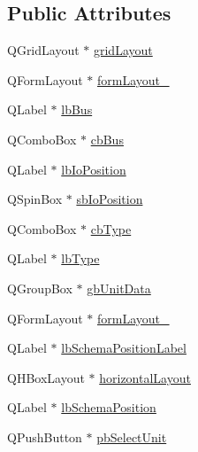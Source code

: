 \subsection*{Public Attributes}
\begin{DoxyCompactItemize}
\item 
Q\-Grid\-Layout $\ast$ \hyperlink{class_ui__mdt_tt_test_node_unit_dialog_a419b2d2d74bbf4b4aeaf0bb4e5357e22}{grid\-Layout}
\item 
Q\-Form\-Layout $\ast$ \hyperlink{class_ui__mdt_tt_test_node_unit_dialog_affa5f0b7adb616181879c18a3a3517ad}{form\-Layout\-\_}
\item 
Q\-Label $\ast$ \hyperlink{class_ui__mdt_tt_test_node_unit_dialog_ad810ff38c45a5ce5bb1a7cfdc1e9f6ab}{lb\-Bus}
\item 
Q\-Combo\-Box $\ast$ \hyperlink{class_ui__mdt_tt_test_node_unit_dialog_a21ccd7c61ed548a5ec40505026d55e23}{cb\-Bus}
\item 
Q\-Label $\ast$ \hyperlink{class_ui__mdt_tt_test_node_unit_dialog_a76c2d38adeb2804d37b4727bde8816ef}{lb\-Io\-Position}
\item 
Q\-Spin\-Box $\ast$ \hyperlink{class_ui__mdt_tt_test_node_unit_dialog_ac9c8fc92eea1cbd5053a6327af4cf36c}{sb\-Io\-Position}
\item 
Q\-Combo\-Box $\ast$ \hyperlink{class_ui__mdt_tt_test_node_unit_dialog_abffeab8f06517270cc76e7f79cb8abc7}{cb\-Type}
\item 
Q\-Label $\ast$ \hyperlink{class_ui__mdt_tt_test_node_unit_dialog_a974b718f19d01de20d8a82dffd767af6}{lb\-Type}
\item 
Q\-Group\-Box $\ast$ \hyperlink{class_ui__mdt_tt_test_node_unit_dialog_a466a0f578df6cfa0bb49703bd76ecf2e}{gb\-Unit\-Data}
\item 
Q\-Form\-Layout $\ast$ \hyperlink{class_ui__mdt_tt_test_node_unit_dialog_a4126386f8db5d7c75334b419d51fbaf0}{form\-Layout\-\_}
\item 
Q\-Label $\ast$ \hyperlink{class_ui__mdt_tt_test_node_unit_dialog_a806610c6ea6743a8a79ce08296089f51}{lb\-Schema\-Position\-Label}
\item 
Q\-H\-Box\-Layout $\ast$ \hyperlink{class_ui__mdt_tt_test_node_unit_dialog_a9345e7e3a9981e02463d165fe7098576}{horizontal\-Layout}
\item 
Q\-Label $\ast$ \hyperlink{class_ui__mdt_tt_test_node_unit_dialog_a486398f96ed8fb20932e40b0501045a6}{lb\-Schema\-Position}
\item 
Q\-Push\-Button $\ast$ \hyperlink{class_ui__mdt_tt_test_node_unit_dialog_a1dbfb594a879051d7bc202af995ad68c}{pb\-Select\-Unit}

\end{DoxyCompactItemize}
